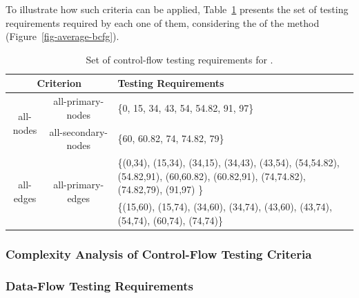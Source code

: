 To illustrate how such criteria can be applied,
Table~\ref{tab-ctrl-requirements} presents the set of testing
requirements required by each one of them, considering the \BG of
the method  (Figure~\ref{fig-average-bcfg}).

\begin{table}[!ht]
\begin{center}\cmdsize
\caption{Set of control-flow testing requirements for
 \BG.}\label{tab-ctrl-requirements}
\begin{tabular}{|c|c|p{}|}
  \hline
  \multicolumn{2}{|c|}{\textbf{Criterion}} & \textbf{Testing Requirements} \\
  \hline
  \multirow{2}{1.5cm}{\centering all-nodes} &
    \multirow{1}{3cm}{\centering all-primary-nodes} & \{0, 15, 34, 43, 54, 54.82, 91, 97\} \\ \cline{2-3}
  & \multirow{1}{3cm}{\centering all-secondary-nodes} & \{60, 60.82, 74, 74.82, 79\} \\
  \hline

  \multirow{4}{1.5cm}{\centering all-edges} & \multirow{2}{3cm}{\centering all-primary-edges} & \{(0,34), (15,34), (34,15), (34,43), (43,54),
                                                         (54,54.82), (54.82,91), (60,60.82),
                                                         (60.82,91), (74,74.82), (74.82,79), (91,97) \} \\
               \cline{2-3}
  & \multirow{2}{3cm}{\centering all-secondary-edges} & \{(15,60), (15,74), (34,60), (34,74), (43,60), (43,74), (54,74),
  (60,74), (74,74)\} \\
  \hline
\end{tabular}
\end{center}
\end{table}

\subsubsection{Complexity Analysis of Control-Flow Testing
Criteria}


\subsubsection{Data-Flow Testing
Requirements}\label{sec:data-requirements}

